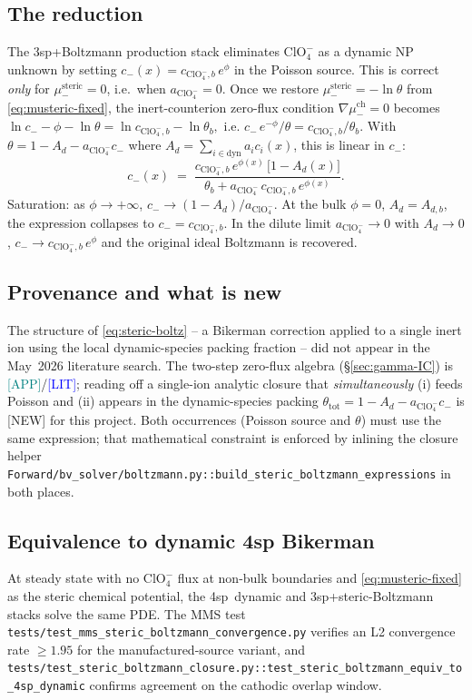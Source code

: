 \documentclass[11pt]{article}
\newcommand{\lit}{\textcolor{blue}{[LIT]}}
\newcommand{\app}{\textcolor{teal}{[APP]}}
\newcommand{\new}{\textcolor{red!70!black}{[NEW]}}
\newcommand{\ClO}{\text{ClO}_4^-}
\newcommand{\msteric}{\mu^{\mathrm{steric}}}
\newcommand{\mch}{\mu^{\mathrm{ch}}}
\begin{document}
\subsection{The reduction}
The 3sp+Boltzmann production stack eliminates $\ClO$ as a dynamic NP
unknown by setting $c_-(x) = c_{\ClO,b}\,e^{\phi}$ in the Poisson source.
This is correct \emph{only} for $\msteric_-=0$, i.e.\ when $a_{\ClO}=0$.
Once we restore $\msteric_- = -\ln\theta$ from
\eqref{eq:musteric-fixed}, the inert-counterion zero-flux condition
$\nabla\mch_- = 0$ becomes
\(
  \ln c_- - \phi - \ln\theta = \ln c_{\ClO,b} - \ln\theta_b,
\)
i.e.
\(
  c_-\,e^{-\phi}/\theta = c_{\ClO,b}/\theta_b.
\)
With $\theta = 1 - A_d - a_{\ClO} c_-$ where
$A_d = \sum_{i\in\text{dyn}} a_i c_i(x)$, this is linear in $c_-$:
\begin{equation}
  \boxed{\;
  c_-(x) \;=\;
   \frac{c_{\ClO,b}\,e^{\phi(x)}\,\bigl[1-A_d(x)\bigr]}
        {\theta_b + a_{\ClO}\,c_{\ClO,b}\,e^{\phi(x)}}.
  \;}
  \label{eq:steric-boltz}
\end{equation}
Saturation: as $\phi\to+\infty$,
$c_-\to (1-A_d)/a_{\ClO}$.  At the bulk $\phi=0$, $A_d=A_{d,b}$, the
expression collapses to $c_- = c_{\ClO,b}$.  In the dilute limit
$a_{\ClO}\to 0$ with $A_d\to 0$, $c_- \to c_{\ClO,b}\,e^{\phi}$ and
the original ideal Boltzmann is recovered.

\subsection{Provenance and what is new}
The structure of \eqref{eq:steric-boltz} -- a Bikerman correction
applied to a single inert ion using the local dynamic-species
packing fraction -- did not appear in the May~2026 literature search.
The two-step zero-flux algebra (\S\ref{sec:gamma-IC}) is
\app{}/\lit{}; reading off a single-ion analytic closure that
\emph{simultaneously} (i) feeds Poisson and (ii) appears in the
dynamic-species packing $\theta_{\mathrm{tot}} = 1 - A_d - a_{\ClO}c_-$
is \new{} for this project.  Both occurrences (Poisson source and
$\theta$) must use the same expression; that mathematical
constraint is enforced by inlining the closure helper
\texttt{Forward/bv\_solver/boltzmann.py::build\_steric\_boltzmann\_expressions}
in both places.

\subsection{Equivalence to dynamic 4sp Bikerman}
At steady state with no $\ClO$ flux at non-bulk boundaries and
\eqref{eq:musteric-fixed} as the steric chemical potential, the
4sp~dynamic and 3sp+steric-Boltzmann stacks solve the same PDE.
The MMS test \texttt{tests/test\_mms\_steric\_boltzmann\_convergence.py}
verifies an L2 convergence rate $\ge 1.95$ for the
manufactured-source variant, and
\texttt{tests/test\_steric\_boltzmann\_closure.py::test\_steric\_boltzmann\_equiv\_to\_4sp\_dynamic}
confirms agreement on the cathodic overlap window.
\end{document}
